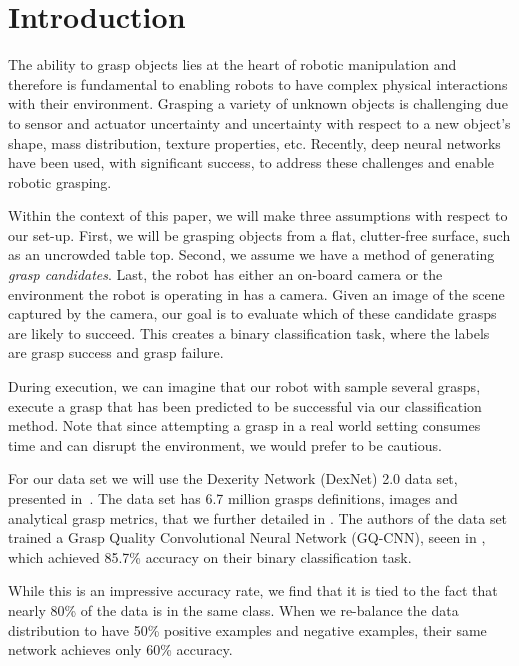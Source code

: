 
\section{Introduction}
\label{sec:intro}

The ability to grasp objects lies at the heart of robotic manipulation and therefore is fundamental to enabling robots to have complex physical interactions with their environment. 
Grasping a variety of unknown objects is challenging due to sensor and actuator uncertainty and uncertainty with respect to a new object's shape, mass distribution, texture properties, etc. 
Recently, deep neural networks have been used, with significant success, to address these challenges and enable robotic grasping. 

Within the context of this paper, we will make three assumptions with respect to our set-up. 
First, we will be grasping objects from a flat, clutter-free surface, such as an uncrowded table top. 
Second, we assume we have a method of generating \textit{grasp candidates}. 
Last, the robot has either an on-board camera or the environment the robot is operating in has a camera. 
Given an image of the scene captured by the camera, our goal is to evaluate which of these candidate grasps are likely to succeed. 
This creates a binary classification task, where the labels are grasp success and grasp failure. 

During execution, we can imagine that our robot with sample several grasps, execute a grasp that has been predicted to be successful via our classification method.  
Note that since attempting a grasp in a real world setting consumes time and can disrupt the environment, we would prefer to be cautious. 

For our data set we will use the Dexerity Network (DexNet) 2.0 data set, presented in~\cite{mahler2017dex}. 
The data set has 6.7 million grasps definitions, images and analytical grasp metrics, that we further detailed in . 
The authors of the data set trained a Grasp Quality Convolutional Neural Network (GQ-CNN), seeen in , which achieved 85.7\% accuracy on their binary classification task.

While this is an impressive accuracy rate, we find that it is tied to the fact that nearly 80\% of the data is in the same class. 
When we re-balance the data distribution to have 50\% positive examples and negative examples, their same network achieves only 60\% accuracy. 

